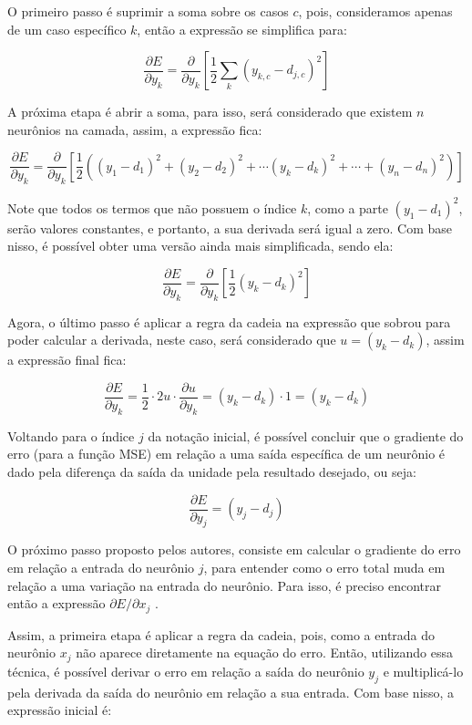 O primeiro passo é suprimir a soma sobre os casos $c$, pois, consideramos apenas de um caso específico $k$, então a expressão se simplifica para:

\[
    \frac{\partial E}{\partial y_k} = \frac{\partial}{\partial y_k} \left[ \frac{1}{2} \sum_k (y_{k, c} - d_{j, c})^2\right]
\]

A próxima etapa é abrir a soma, para isso, será considerado que existem $n$ neurônios na camada, assim, a expressão fica:

\[
    \frac{\partial E}{\partial y_k} = \frac{\partial}{\partial y_k} \left[ \frac{1}{2} \left( (y_1 - d_1)^2 + (y_2 - d_2)^2 + \cdots (y_k - d_k)^2 + \cdots + (y_n - d_n)^2 \right) \right]
\]

Note que todos os termos que não possuem o índice $k$, como a parte $(y_1 - d_1)^2$, serão valores constantes, e portanto, a sua derivada será igual a zero. Com base nisso, é possível obter uma versão ainda mais simplificada, sendo ela:

\[
    \frac{\partial E}{\partial y_k} = \frac{\partial}{\partial y_k} \left[ \frac{1}{2} (y_k - d_k)^2 \right]
\]

Agora, o último passo é aplicar a regra da cadeia na expressão que sobrou para poder calcular a derivada, neste caso, será considerado que $u = (y_k - d_k)$, assim a expressão final fica:

\[
    \frac{\partial E}{\partial y_k} = \frac{1}{2} \cdot 2u \cdot \frac{\partial u}{\partial y_k} = (y_k - d_k) \cdot 1 = (y_k - d_k)
\]

Voltando para o índice $j$ da notação inicial, é possível concluir que o gradiente do erro (para a função MSE) em relação a uma saída específica de um neurônio é dado pela diferença da saída da unidade pela resultado desejado, ou seja:

\[
    \frac{\partial E}{\partial y_j} = (y_j - d_j) 
\]

O próximo passo proposto pelos autores, consiste em calcular o gradiente do erro em relação a entrada do neurônio $j$, para entender como o erro total muda em relação a uma variação na entrada do neurônio. Para isso, é preciso encontrar então a expressão $\partial E / \partial x_j$ \parencite{BackpropagationArticle}.

Assim, a primeira etapa é aplicar a regra da cadeia, pois, como a entrada do neurônio $x_j$ não aparece diretamente na equação do erro. Então, utilizando essa técnica, é possível derivar o erro em relação a saída do neurônio $y_j$ e multiplicá-lo pela derivada da saída do neurônio em relação a sua entrada. Com base nisso, a expressão inicial é:

